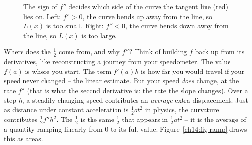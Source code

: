 \begin{figure}[htbp]
\centering
{}
\hspace{0.3cm}
\caption{The sign of $f''$ decides which side of the curve the tangent line (red)
lies on. Left: $f''>0$, the curve bends up away from the line, so $L(x)$ is too
small. Right: $f''<0$, the curve bends down away from the line, so $L(x)$ is too
large.}
\label{ch14:fig-concavity}
\end{figure}

\begin{whybox}
Where does the $\tfrac12$ come from, and why $f''$? Think of building $f$ back up
from its derivatives, like reconstructing a journey from your speedometer. The
value $f(a)$ is where you start. The term $f'(a)h$ is how far you would travel if
your speed never changed -- the linear estimate. But your speed \emph{does} change,
at the rate $f''$ (that is what the second derivative is: the rate the slope
changes). Over a step $h$, a steadily changing speed contributes an
\emph{average} extra displacement. Just as distance under constant acceleration is
$\tfrac12 a t^2$ in physics, the curvature contributes $\tfrac12 f'' h^2$. The
$\tfrac12$ is the same $\tfrac12$ that appears in $\tfrac12 at^2$ -- it is the
average of a quantity ramping linearly from $0$ to its full value.
Figure~\ref{ch14:fig-ramp} draws this as areas.
\end{whybox}

